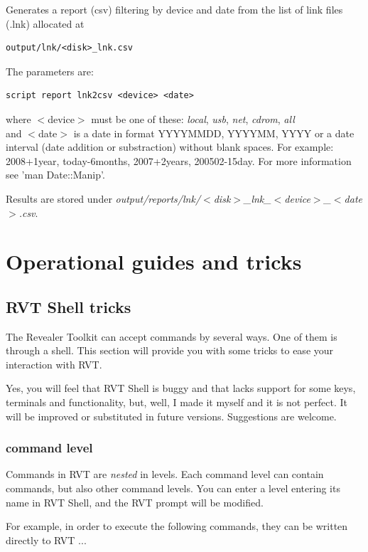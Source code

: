 \documentclass[a4paper,11pt,oneside]{report}
\begin{document}
Generates a report (csv) filtering by device and date from the list of link files (.lnk) allocated at
\begin{verbatim}
output/lnk/<disk>_lnk.csv
\end{verbatim}

The parameters are:
\begin{verbatim}
script report lnk2csv <device> <date>
\end{verbatim}
where $<$device$>$ must be one of these: \emph{local}, \emph{usb}, \emph{net}, \emph{cdrom}, \emph{all}\\
and $<$date$>$ is a date in format YYYYMMDD, YYYYMM, YYYY or a date interval (date addition or substraction) without blank spaces. 
For example: 2008+1year, today-6months, 2007+2years, 200502-15day. For more information  see 'man Date::Manip'.

Results are stored under \emph{output/reports/lnk/$<$disk$>$\_lnk\_$<$device$>$\_$<$date$>$.csv}.
\chapter{Operational guides and tricks}



\section{RVT Shell tricks}

The Revealer Toolkit can accept commands by several ways. One of them is through a shell. This section will provide you with some tricks to ease your interaction with RVT.

Yes, you will feel that RVT Shell is buggy and that lacks support for some keys, terminals and functionality, but, well, I made it myself and it is not perfect. It will be improved or substituted in future versions. Suggestions are welcome.


\subsection{command level}

Commands in RVT are \emph{nested} in levels. Each command level can contain commands, but also other command levels. You can enter a level entering its name in RVT Shell, and the RVT prompt will be modified.

For example, in order to execute the following commands, they can be written directly to RVT ...
\end{document}
